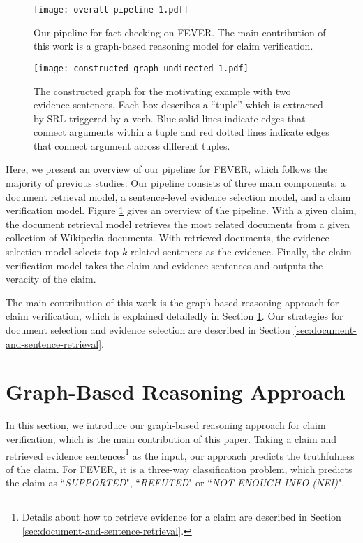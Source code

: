 \documentclass[11pt,a4paper]{article}
\begin{document}
\begin{figure}[h]
	\texttt{[image: overall-pipeline-1.pdf]}
	\caption{Our pipeline for fact checking on FEVER. The main contribution of this work is a graph-based reasoning model for claim verification. }
	\label{fig:overall-pipeline}
\end{figure}
\begin{figure*}[t]
	\centering
	\texttt{[image: constructed-graph-undirected-1.pdf]}
	\caption{The constructed graph for the motivating example with two evidence sentences. Each box describes a ``tuple'' which is extracted by SRL triggered by a verb. Blue solid lines indicate edges that connect arguments within a tuple and red dotted lines indicate edges that connect argument across different tuples.}
	\label{fig:graph-construction}
\end{figure*} 
Here, we present an overview of our pipeline for FEVER, which follows the majority of previous studies.
Our pipeline consists of three main components: a {document retrieval model}, a {sentence-level evidence selection model}, and a {claim verification model}.  
Figure \ref{fig:overall-pipeline} gives an overview of the pipeline.
With a given claim, the {document retrieval model} retrieves the most related documents from a given collection of Wikipedia documents. 
With retrieved documents, the {evidence selection model} selects top-$k$ related sentences as the evidence. 
Finally, the {claim verification model} takes the claim and evidence sentences and outputs the 
veracity of the claim. 


The main contribution of this work is the graph-based reasoning approach for claim verification, which is explained detailedly in Section \ref{section:claim-verification}.
Our strategies for document selection and evidence selection are described in Section \ref{sec:document-and-sentence-retrieval}.



\section{Graph-Based Reasoning Approach}
\label{section:claim-verification}
In this section, we introduce our graph-based reasoning approach for claim verification, which is the main contribution of this paper. 
Taking a claim and retrieved evidence sentences\footnote{Details about how to retrieve evidence for a claim are described in Section \ref{sec:document-and-sentence-retrieval}.} as the input, our approach predicts the truthfulness of the claim. For FEVER, it is a three-way classification problem, which predicts the claim as ``\textsl{SUPPORTED}", ``\textsl{REFUTED}" or ``\textsl{NOT ENOUGH INFO (NEI)}".
\end{document}
